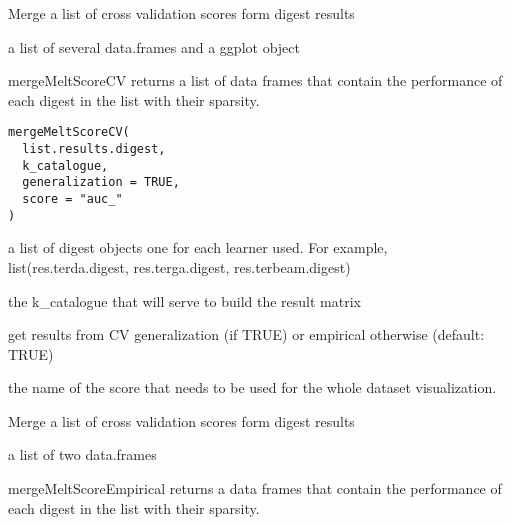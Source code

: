 \documentclass[a4paper]{book}
\begin{document}
%
\begin{Details}
Merge a list of cross validation scores form digest results
\end{Details}
%
\begin{Value}
a list of several data.frames and a ggplot object
\end{Value}
%
\begin{Description}
mergeMeltScoreCV returns a list of data frames that contain the performance of each digest in the list with their sparsity.
\end{Description}
%
\begin{Usage}
\begin{verbatim}
mergeMeltScoreCV(
  list.results.digest,
  k_catalogue,
  generalization = TRUE,
  score = "auc_"
)
\end{verbatim}
\end{Usage}
%
\begin{Arguments}
\begin{ldescription}
\item[\code{list.results.digest:}] a list of digest objects one for each learner used. For example, list(res.terda.digest, res.terga.digest, res.terbeam.digest)

\item[\code{k\_catalogue:}] the k\_catalogue that will serve to build the result matrix

\item[\code{generalization:}] get results from CV generalization (if TRUE) or empirical otherwise (default: TRUE)

\item[\code{score:}] the name of the score that needs to be used for the whole dataset visualization.
\end{ldescription}
\end{Arguments}
%
\begin{Details}
Merge a list of cross validation scores form digest results
\end{Details}
%
\begin{Value}
a list of two data.frames
\end{Value}
%
\begin{Description}
mergeMeltScoreEmpirical returns a data frames that contain the performance of each digest in the list with their sparsity.
\end{Description}
\end{document}
